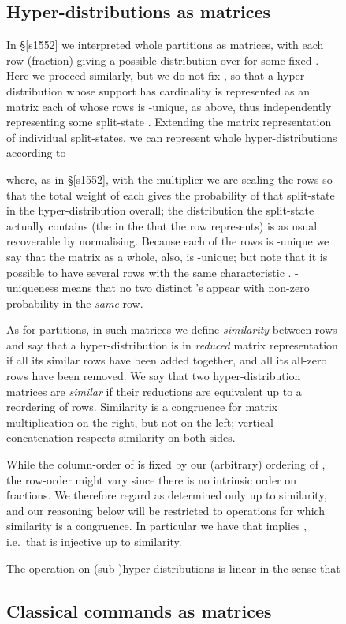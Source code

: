 \documentclass[runningheads]{llncs}
\newcommand\Sec[1] {Sec.~\ref{#1}}
\renewcommand\Sec[1] {\S\ref{#1}}
\newenvironment{Figure}[2][t]{\begin{figure}[#1]\def\Label{#2}\small}{\label{\Label}\end{figure}}
\begin{document}
\begin{Figure}[ht!]{f1228}
\subsection{Hyper-distributions as matrices}

In \Sec{s1552} we interpreted whole partitions as matrices, with each row (fraction) giving a possible distribution over  for some fixed . Here we proceed similarly, but we do not fix , so that a hyper-distribution  whose support has cardinality  is represented as an  matrix  each of whose rows is -unique, as above, thus independently representing some split-state . 
Extending the matrix representation of individual split-states, we can represent whole hyper-distributions according to

where, as in \Sec{s1552}, with the multiplier  we are scaling the rows so that the total weight of each gives the probability of that split-state in the hyper-distribution overall; the distribution the split-state actually contains (the  in the  that the row represents) is as usual recoverable by normalising. Because each of the rows is -unique we say that the matrix as a whole, also, is -unique; but note that it is possible to have several rows with the same characteristic . -uniqueness means that no two distinct 's appear with non-zero probability in the \emph{same} row.

As for partitions, in such matrices we define \emph{similarity} between rows and say that a hyper-distribution is in \emph{reduced} matrix representation if all its similar rows have been added together, and all its all-zero rows have been removed. We say that two hyper-distribution matrices are \emph{similar}  if their reductions are equivalent up to a reordering of rows. Similarity is a congruence for matrix multiplication on the right, but not on the left; vertical concatenation  respects similarity on both sides.

While the column-order of  is fixed by our (arbitrary) ordering of , the row-order might vary since there is no intrinsic order on fractions. We therefore regard  as determined only up to similarity, and our reasoning below will be restricted to operations for which similarity is a congruence. In particular we have that  implies , i.e.\ that  is injective up to similarity.


The operation  on (sub-)hyper-distributions is linear in the sense that


\subsection{Classical commands as matrices}


\end{Figure}
\end{document}
